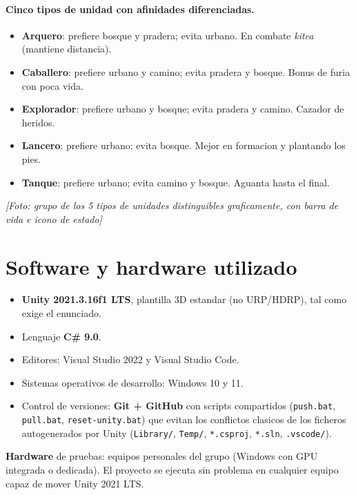 \documentclass[12pt,a4paper]{article}
\newcommand{\fotoplaceholder}[1]{%
    \par\medskip\noindent%
    \begin{center}%
    \begin{tcolorbox}[
        colback=fotobg,
        colframe=fotoborder,
        boxrule=0.8pt,
        arc=2pt,
        width=0.85\textwidth,
        halign=center,
        valign=center,
        height=2.4cm
    ]
    \itshape\color{gray} [Foto: #1]
    \end{tcolorbox}%
    \end{center}\medskip%
}
\begin{document}
\paragraph{Cinco tipos de unidad con afinidades diferenciadas.}
\begin{itemize}[leftmargin=1.5em]
    \item \textbf{Arquero}: prefiere bosque y pradera; evita urbano. En combate \emph{kitea} (mantiene distancia).
    \item \textbf{Caballero}: prefiere urbano y camino; evita pradera y bosque. Bonus de furia con poca vida.
    \item \textbf{Explorador}: prefiere urbano y bosque; evita pradera y camino. Cazador de heridos.
    \item \textbf{Lancero}: prefiere urbano; evita bosque. Mejor en formacion y plantando los pies.
    \item \textbf{Tanque}: prefiere urbano; evita camino y bosque. Aguanta hasta el final.
\end{itemize}

\fotoplaceholder{grupo de los 5 tipos de unidades distinguibles graficamente, con barra de vida e icono de estado}

\section{Software y hardware utilizado}

\begin{itemize}[leftmargin=1.5em]
    \item \textbf{Unity 2021.3.16f1 LTS}, plantilla 3D estandar (no URP/HDRP), tal como exige el enunciado.
    \item Lenguaje \textbf{C\# 9.0}.
    \item Editores: Visual Studio 2022 y Visual Studio Code.
    \item Sistemas operativos de desarrollo: Windows 10 y 11.
    \item Control de versiones: \textbf{Git + GitHub} con scripts compartidos (\texttt{push.bat}, \texttt{pull.bat}, \texttt{reset-unity.bat}) que evitan los conflictos clasicos de los ficheros autogenerados por Unity (\texttt{Library/}, \texttt{Temp/}, \texttt{*.csproj}, \texttt{*.sln}, \texttt{.vscode/}).
\end{itemize}

\textbf{Hardware} de pruebas: equipos personales del grupo (Windows con
GPU integrada o dedicada). El proyecto se ejecuta sin problema en
cualquier equipo capaz de mover Unity 2021 LTS.
\end{document}
